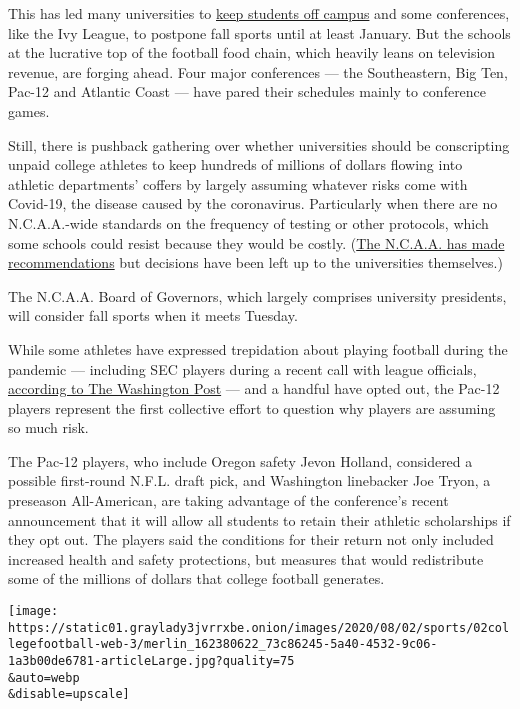 This has led many universities to
\href{https://www.nytimes3xbfgragh.onion/2020/07/08/upshot/virus-colleges-harvard-reopening.html}{keep
students off campus} and some conferences, like the Ivy League, to
postpone fall sports until at least January. But the schools at the
lucrative top of the football food chain, which heavily leans on
television revenue, are forging ahead. Four major conferences --- the
Southeastern, Big Ten, Pac-12 and Atlantic Coast --- have pared their
schedules mainly to conference games.

Still, there is pushback gathering over whether universities should be
conscripting unpaid college athletes to keep hundreds of millions of
dollars flowing into athletic departments' coffers by largely assuming
whatever risks come with Covid-19, the disease caused by the
coronavirus. Particularly when there are no N.C.A.A.-wide standards on
the frequency of testing or other protocols, which some schools could
resist because they would be costly.
(\href{https://www.nytimes3xbfgragh.onion/2020/07/16/sports/ncaafootball/ncaa-guidelines-fall-sports.html}{The
N.C.A.A. has made recommendations} but decisions have been left up to
the universities themselves.)

The N.C.A.A. Board of Governors, which largely comprises university
presidents, will consider fall sports when it meets Tuesday.

While some athletes have expressed trepidation about playing football
during the pandemic --- including SEC players during a recent call with
league officials,
\href{https://www.washingtonpost.com/sports/2020/08/01/sec-football-players-safety-meeting/}{according
to The Washington Post} --- and a handful have opted out, the Pac-12
players represent the first collective effort to question why players
are assuming so much risk.

The Pac-12 players, who include Oregon safety Jevon Holland, considered
a possible first-round N.F.L. draft pick, and Washington linebacker Joe
Tryon, a preseason All-American, are taking advantage of the
conference's recent announcement that it will allow all students to
retain their athletic scholarships if they opt out. The players said the
conditions for their return not only included increased health and
safety protections, but measures that would redistribute some of the
millions of dollars that college football generates.

\texttt{[image: https://static01.graylady3jvrrxbe.onion/images/2020/08/02/sports/02collegefootball-web-3/merlin\_162380622\_73c86245-5a40-4532-9c06-1a3b00de6781-articleLarge.jpg?quality=75\\\&auto=webp\\\&disable=upscale]}

